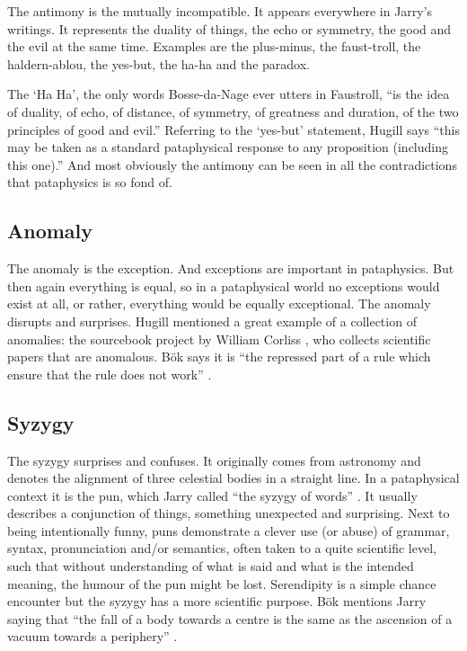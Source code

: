 The antimony is the mutually incompatible. It appears everywhere in Jarry's writings. It represents the duality of things, the echo or symmetry, the good and the evil at the same time. Examples are the plus-minus, the faust-troll, the haldern-ablou, the yes-but, the ha-ha and the paradox.

The `Ha Ha', the only words Bosse-da-Nage ever utters in Faustroll, ``is the idea of duality, of echo, of distance, of symmetry, of greatness and duration, of the two principles of good and evil.'' \autocite{Hugill2012} Referring to the `yes-but' statement, Hugill says ``this may be taken as a standard pataphysical response to any proposition (including this one).'' And most obviously the antimony can be seen in all the contradictions that pataphysics is so fond of.


\subsection{Anomaly}
\label{s:anomaly}

The anomaly is the exception. And exceptions are important in pataphysics. But then again everything is equal, so in a pataphysical world no exceptions would exist at all, or rather, everything would be equally exceptional. The anomaly disrupts and surprises. Hugill mentioned a great example of a collection of anomalies: the sourcebook project by William Corliss \autocite*{Corlissnd}, who collects scientific papers that are anomalous. Bök says it is ``the repressed part of a rule which ensure that the rule does not work'' \autocite*{Bok2002}.


\subsection{Syzygy}
\label{s:syzygy}

The syzygy surprises and confuses. It originally comes from astronomy and denotes the alignment of three celestial bodies in a straight line. In a pataphysical context it is the pun, which Jarry called ``the syzygy of words'' \autocite*{Jarry1996}. It usually describes a conjunction of things, something unexpected and surprising. Next to being intentionally funny, puns demonstrate a clever use (or abuse) of grammar, syntax, pronunciation and/or semantics, often taken to a quite scientific level, such that without understanding of what is said and what is the intended meaning, the humour of the pun might be lost. Serendipity is a simple chance encounter but the syzygy has a more scientific purpose. Bök mentions Jarry saying that ``the fall of a body towards a centre is the same as the ascension of a vacuum towards a periphery'' \autocite*{Bok2002}.


